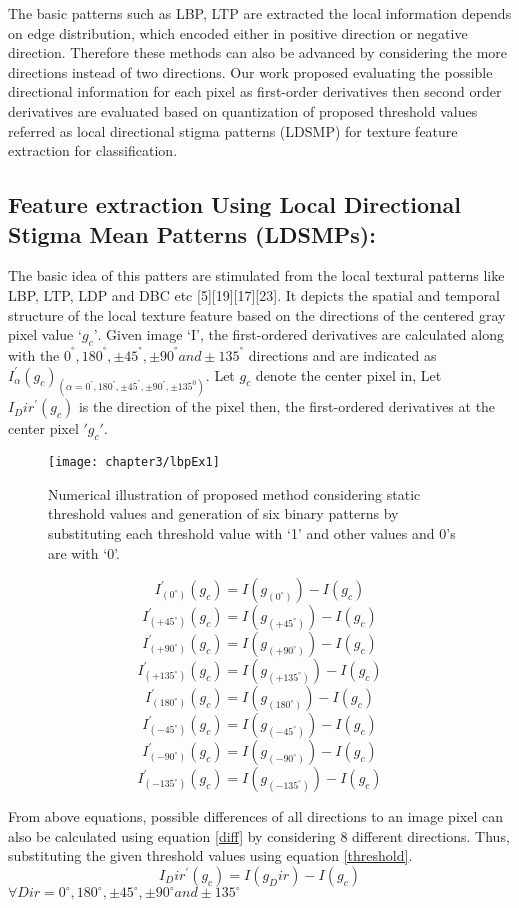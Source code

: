 The basic patterns such as LBP, LTP are extracted the local information depends on edge distribution, which encoded either in positive direction or negative direction. Therefore these methods can also be advanced by considering the more directions instead of two directions. Our work proposed evaluating the possible directional information for each pixel as first-order derivatives then second order derivatives are evaluated based on quantization of proposed threshold values referred as local directional stigma patterns (LDSMP) for texture feature extraction for classification. 

\subsection{Feature extraction Using Local Directional Stigma Mean Patterns (LDSMPs):}
The basic idea of this patters are stimulated from the local textural patterns like LBP, LTP, LDP and DBC etc [5][19][17][23]. It depicts the spatial and temporal structure of the local texture feature based on the directions of the centered gray pixel value $‘g_c’$. Given image ‘Ι’, the first-ordered derivatives are calculated along with the  $0^°, 180^°, ±45^°, ± 90^°  and ± 135^°$  directions and are indicated as $I_α^' (g_c )_(α= 0^°,180^°,±45^°,± 90^°,± 135^0 ) $. Let $g_c$ denote the center pixel in, Let $I_Dir^' (g_c )$   is the direction of the pixel then, the first-ordered derivatives at the center pixel  $'g_c'$.

\begin{figure}
	\centering
	\texttt{[image: chapter3/lbpEx1]}
	\caption{Numerical illustration of proposed method considering static threshold values and generation of six binary patterns by substituting each threshold value with ‘1’ and other values and 0’s are with ‘0’.}
	\label{fig:lbpex1}
\end{figure}

$$I_(0^{\circ})^' (g_c ) = I(g_(0^\circ ) )- I(g_c )$$
$$I_(+45^\circ)^' (g_c ) = I(g_(+45^\circ) )- I(g_c )$$
$$I_(+90^\circ)^' (g_c ) = I(g_(+90^\circ) )- I(g_c )$$
$$I_(+135^\circ)^' (g_c ) = I(g_(+135^\circ) )- I(g_c )$$
$$I_(180^\circ)^' (g_c ) =I(g_(180^\circ))- I(g_c )$$
$$I_(-45^\circ)^' (g_c ) = I(g_(-45^\circ))- I(g_c )$$
$$I_(-90^\circ)^' (g_c ) = I(g_(-90^\circ))- I(g_c )$$
$$I_(-135^\circ)^' (g_c ) = I(g_(-135^\circ))- I(g_c )$$

From above equations, possible differences of all directions to an image pixel can also be calculated using equation \ref{diff} by considering 8 different directions. Thus, substituting the given threshold values using equation \ref{threshold}.
\begin{equation}
I_Dir^' (g_c ) = I(g_Dir )- I(g_c ) 
\end{equation}
$\forall Dir = 0^\circ ,180^\circ,±45^\circ,± 90^\circ  and ± 135^\circ$

